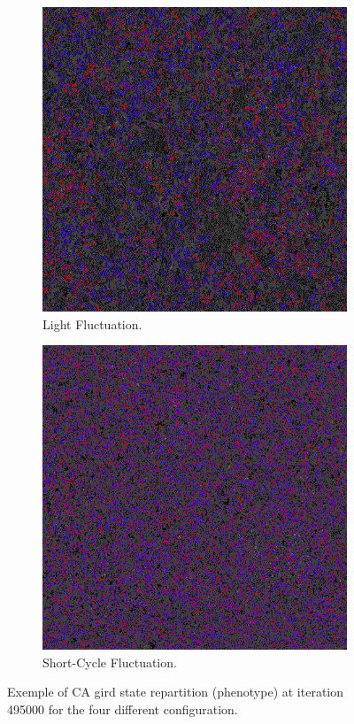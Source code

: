 \begin{figure}[H]
\begin{subfigure}{.25\textwidth}
  \centering
  \includegraphics[width=.9\linewidth]{img/light495000}
  \caption{Light Fluctuation.}
  \label{fig:sfig2}
\end{subfigure}%
\begin{subfigure}{.25\textwidth}
  \centering
  \includegraphics[width=.9\linewidth]{img/small495000}
  \caption{Short-Cycle Fluctuation.}
  \label{fig:sfig1}
\end{subfigure}
\caption{Exemple of CA gird state repartition (phenotype) at iteration 495000 for the four different configuration.}
\label{fig:phenoexpl}
\end{figure}